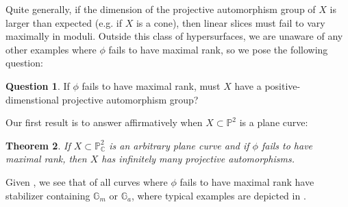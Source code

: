 \documentclass[11pt,reqno]{amsart}
\theoremstyle{plain}
\newtheorem{theorem}{Theorem}[section]
\theoremstyle{definition}
\newtheorem{question}[theorem]{Question}
\theoremstyle{remark}
\numberwithin{equation}{section}
\numberwithin{equation}{section}
\newcommand{\PP}{\mathbb{P}}
\newcommand{\CC}{\mathbb{C}}
\begin{document}
    Quite generally, if the dimension of the projective automorphism group of $X$ is larger than expected (e.g. if $X$ is a cone), then linear slices must fail to vary maximally in moduli.  Outside this class of hypersurfaces, we are unaware of any other examples where $\phi$ fails to have maximal rank, so we pose the following question:
\begin{question}
\label{question:Automorphisms}  If $\phi$ fails to have maximal rank, must $X$ have a positive-dimenstional projective automorphism group?
\end{question}

Our first result is to answer  affirmatively when $X \subset \PP^{2}$ is a plane curve:
\begin{theorem}
\label{thm:curveintro}
If $X\subset \PP^2_{\CC}$ is an arbitrary plane curve and if $\phi$ fails to have maximal rank, then $X$ has infinitely many projective automorphisms.
\end{theorem}
Given , we see that of all curves where $\phi$ fails to have maximal rank have stabilizer containing $\mathbb{G}_m$ or $\mathbb{G}_a$, where typical examples are depicted in .
\end{document}
